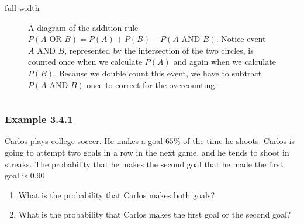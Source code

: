 \documentclass[letterpaper,10pt,english]{jupyterBook}
\begin{document}
\begin{sphinxuseclass}{full-width}
\begin{figure}[htbp]
\centering
\capstart

\noindent{}
\caption{A diagram of the addition rule \(P(A \text{ OR } B) = P(A) + P(B) - P(A \text{ AND } B)\). Notice event \(A \text{ AND } B\), represented by the intersection of the two circles, is counted once when we calculate \(P(A)\) and again when we calculate \(P(B)\). Because we double count this event, we have to subtract \(P(A \text{ AND } B)\) once to correct for the overcounting.}\label{\detokenize{Ch3 Probability/3.4 Addition Rules and Mutually Exclusive Events:venn-add-rule}}\end{figure}

\end{sphinxuseclass}

\bigskip\hrule\bigskip



\subsubsection{Example 3.4.1}
\label{\detokenize{Ch3 Probability/3.4 Addition Rules and Mutually Exclusive Events:example-3-4-1}}
\sphinxAtStartPar
Carlos plays college soccer. He makes a goal \(65\%\) of the time he shoots. Carlos is going to attempt two goals in a row in the next game, and he tends to shoot in streaks. The probability that he makes the second goal  that he made the first goal is \(0.90\).
\begin{enumerate}
%
\item {} 
\sphinxAtStartPar
What is the probability that Carlos makes both goals?

\item {} 
\sphinxAtStartPar
What is the probability that Carlos makes the first goal or the second goal?

\end{enumerate}
\end{document}
